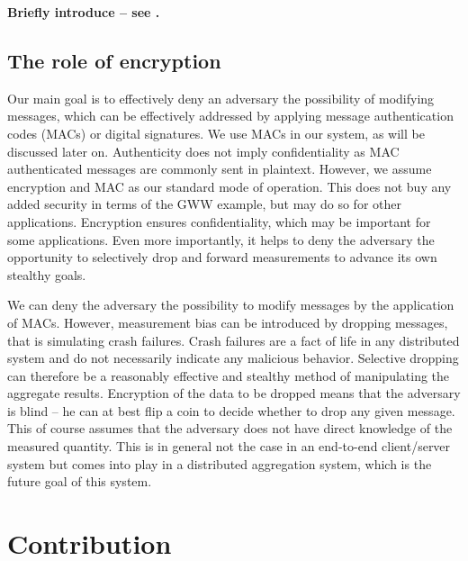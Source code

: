 \textbf{Briefly introduce -- see \cite{maurer2006}.}

\subsection*{The role of encryption}

Our main goal is to effectively deny an adversary the possibility of modifying messages, which can be effectively addressed by applying message authentication codes (MACs) or digital signatures. We use MACs in our system, as will be discussed later on. Authenticity does not imply confidentiality as MAC authenticated messages are commonly sent in plaintext. However, we assume encryption and MAC as our standard mode of operation. This does not buy any added security in terms of the GWW example, but may do so for other applications. Encryption ensures confidentiality, which may be important for some applications. Even more importantly, it helps to deny the adversary the opportunity to selectively drop and forward measurements to advance its own stealthy goals. 

We can deny the adversary the possibility to modify messages by the application of MACs. However, measurement bias can be introduced by dropping messages, that is simulating crash failures. Crash failures are a fact of life in any distributed system and do not necessarily indicate any malicious behavior. Selective dropping can therefore be a reasonably effective and stealthy method of manipulating the aggregate results. Encryption of the data to be dropped means that the adversary is blind -- he can at best flip a coin to decide whether to drop any given message. This of course assumes that the adversary does not have direct knowledge of the measured quantity. This is in general not the case in an end-to-end client/server system but comes into play in a distributed aggregation system, which is the future goal of this system.

\section{Contribution}

